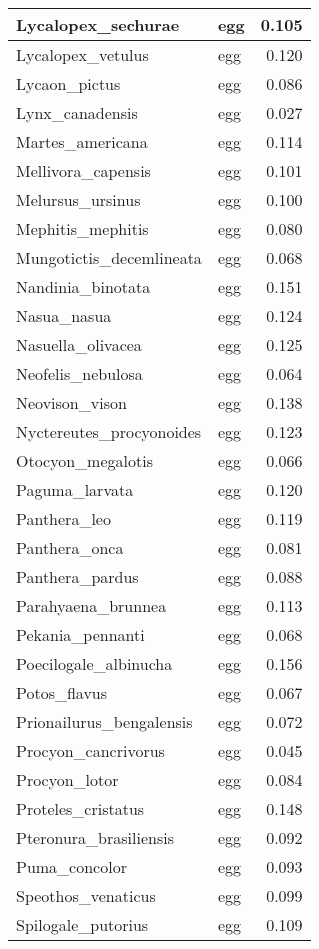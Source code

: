 \begin{table}
\begin{tabular}[t]{l|l|r}
\hline
Lycalopex\_sechurae & egg & 0.105\\
\hline
Lycalopex\_vetulus & egg & 0.120\\
\hline
Lycaon\_pictus & egg & 0.086\\
\hline
Lynx\_canadensis & egg & 0.027\\
\hline
Martes\_americana & egg & 0.114\\
\hline
Mellivora\_capensis & egg & 0.101\\
\hline
Melursus\_ursinus & egg & 0.100\\
\hline
Mephitis\_mephitis & egg & 0.080\\
\hline
Mungotictis\_decemlineata & egg & 0.068\\
\hline
Nandinia\_binotata & egg & 0.151\\
\hline
Nasua\_nasua & egg & 0.124\\
\hline
Nasuella\_olivacea & egg & 0.125\\
\hline
Neofelis\_nebulosa & egg & 0.064\\
\hline
Neovison\_vison & egg & 0.138\\
\hline
Nyctereutes\_procyonoides & egg & 0.123\\
\hline
Otocyon\_megalotis & egg & 0.066\\
\hline
Paguma\_larvata & egg & 0.120\\
\hline
Panthera\_leo & egg & 0.119\\
\hline
Panthera\_onca & egg & 0.081\\
\hline
Panthera\_pardus & egg & 0.088\\
\hline
Parahyaena\_brunnea & egg & 0.113\\
\hline
Pekania\_pennanti & egg & 0.068\\
\hline
Poecilogale\_albinucha & egg & 0.156\\
\hline
Potos\_flavus & egg & 0.067\\
\hline
Prionailurus\_bengalensis & egg & 0.072\\
\hline
Procyon\_cancrivorus & egg & 0.045\\
\hline
Procyon\_lotor & egg & 0.084\\
\hline
Proteles\_cristatus & egg & 0.148\\
\hline
Pteronura\_brasiliensis & egg & 0.092\\
\hline
Puma\_concolor & egg & 0.093\\
\hline
Speothos\_venaticus & egg & 0.099\\
\hline
Spilogale\_putorius & egg & 0.109\\

\end{tabular}
\end{table}
